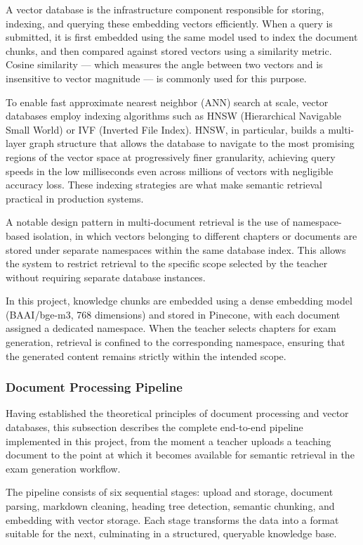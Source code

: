 \documentclass[12pt,a4paper]{article}
\begin{document}
A vector database is the infrastructure component responsible for storing, indexing, and querying these embedding vectors efficiently. When a query is submitted, it is first embedded using the same model used to index the document chunks, and then compared against stored vectors using a similarity metric. Cosine similarity — which measures the angle between two vectors and is insensitive to vector magnitude — is commonly used for this purpose.

To enable fast approximate nearest neighbor (ANN) search at scale, vector databases employ indexing algorithms such as HNSW (Hierarchical Navigable Small World) or IVF (Inverted File Index). HNSW, in particular, builds a multi-layer graph structure that allows the database to navigate to the most promising regions of the vector space at progressively finer granularity, achieving query speeds in the low milliseconds even across millions of vectors with negligible accuracy loss. These indexing strategies are what make semantic retrieval practical in production systems.

A notable design pattern in multi-document retrieval is the use of namespace-based isolation, in which vectors belonging to different chapters or documents are stored under separate namespaces within the same database index. This allows the system to restrict retrieval to the specific scope selected by the teacher without requiring separate database instances.

In this project, knowledge chunks are embedded using a dense embedding model (BAAI/bge-m3, 768 dimensions) and stored in Pinecone, with each document assigned a dedicated namespace. When the teacher selects chapters for exam generation, retrieval is confined to the corresponding namespace, ensuring that the generated content remains strictly within the intended scope.

\subsubsection{Document Processing Pipeline}

Having established the theoretical principles of document processing and vector databases, this subsection describes the complete end-to-end pipeline implemented in this project, from the moment a teacher uploads a teaching document to the point at which it becomes available for semantic retrieval in the exam generation workflow.

The pipeline consists of six sequential stages: upload and storage, document parsing, markdown cleaning, heading tree detection, semantic chunking, and embedding with vector storage. Each stage transforms the data into a format suitable for the next, culminating in a structured, queryable knowledge base.
\end{document}
